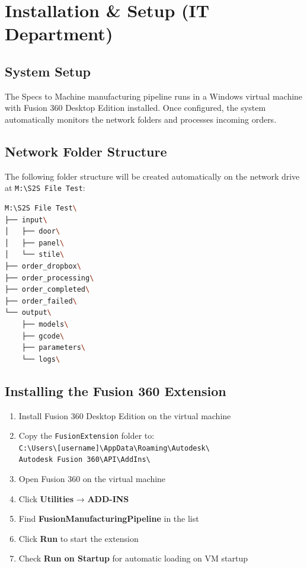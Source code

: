 \documentclass[11pt,letterpaper]{article}
\begin{document}
\section{Installation \& Setup (IT Department)}

\subsection{System Setup}

The Specs to Machine manufacturing pipeline runs in a Windows virtual machine with Fusion 360 Desktop Edition installed. Once configured, the system automatically monitors the network folders and processes incoming orders.

\subsection{Network Folder Structure}

The following folder structure will be created automatically on the network drive at \texttt{M:\textbackslash S2S File Test}:

\begin{lstlisting}[language=bash]
M:\S2S File Test\
├── input\
│   ├── door\
│   ├── panel\
│   └── stile\
├── order_dropbox\
├── order_processing\
├── order_completed\
├── order_failed\
└── output\
    ├── models\
    ├── gcode\
    ├── parameters\
    └── logs\
\end{lstlisting}

\subsection{Installing the Fusion 360 Extension}

\begin{enumerate}
    \item Install Fusion 360 Desktop Edition on the virtual machine
    
    \item Copy the \texttt{FusionExtension} folder to:\\
    \texttt{C:\textbackslash Users\textbackslash [username]\textbackslash AppData\textbackslash Roaming\textbackslash Autodesk\textbackslash}\\
    \texttt{Autodesk Fusion 360\textbackslash API\textbackslash AddIns\textbackslash}
    
    \item Open Fusion 360 on the virtual machine
    
    \item Click \textbf{Utilities} → \textbf{ADD-INS}
    
    \item Find \textbf{FusionManufacturingPipeline} in the list
    
    \item Click \textbf{Run} to start the extension
    
    \item Check \textbf{Run on Startup} for automatic loading on VM startup
\end{enumerate}
\end{document}
